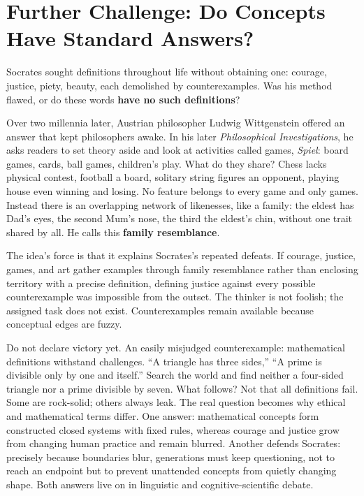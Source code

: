 \section[Further Challenge: Defining Concepts]{Further Challenge: Do Concepts Have Standard Answers?}
Socrates sought definitions throughout life without obtaining one: courage, justice, piety, beauty, each demolished by counterexamples. Was his method flawed, or do these words \textbf{have no such definitions}?

Over two millennia later, Austrian philosopher Ludwig Wittgenstein offered an answer that kept philosophers awake. In his later \textit{Philosophical Investigations}, he asks readers to set theory aside and look at activities called games, \textit{Spiel}: board games, cards, ball games, children's play. What do they share? Chess lacks physical contest, football a board, solitary string figures an opponent, playing house even winning and losing. No feature belongs to every game and only games. Instead there is an overlapping network of likenesses, like a family: the eldest has Dad's eyes, the second Mum's nose, the third the eldest's chin, without one trait shared by all. He calls this \textbf{family resemblance}.

The idea's force is that it explains Socrates's repeated defeats. If courage, justice, games, and art gather examples through family resemblance rather than enclosing territory with a precise definition, defining justice against every possible counterexample was impossible from the outset. The thinker is not foolish; the assigned task does not exist. Counterexamples remain available because conceptual edges are fuzzy.

Do not declare victory yet. An easily misjudged counterexample: mathematical definitions withstand challenges. ``A triangle has three sides,'' ``A prime is divisible only by one and itself.'' Search the world and find neither a four-sided triangle nor a prime divisible by seven. What follows? Not that all definitions fail. Some are rock-solid; others always leak. The real question becomes why ethical and mathematical terms differ. One answer: mathematical concepts form constructed closed systems with fixed rules, whereas courage and justice grow from changing human practice and remain blurred. Another defends Socrates: precisely because boundaries blur, generations must keep questioning, not to reach an endpoint but to prevent unattended concepts from quietly changing shape. Both answers live on in linguistic and cognitive-scientific debate.

